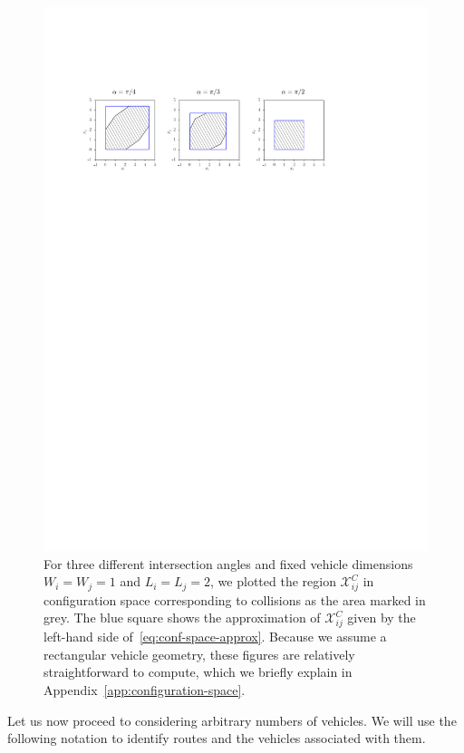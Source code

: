 \documentclass[a4paper]{report}
\theoremstyle{definition}
\theoremstyle{plain}
\begin{document}
\begin{figure}[b]
  \centering
  \includegraphics[scale=1]{figures/intersection-config-spaces}
  \caption{For three different intersection angles and fixed vehicle dimensions
    $W_{i} = W_{j} = 1$ and $L_{i} = L_{j} = 2$, we plotted the region
    $\mathcal{X}_{ij}^{C}$ in configuration space corresponding to collisions as
    the area marked in grey. The blue square shows the approximation of
    $\mathcal{X}_{ij}^C$ given by the left-hand side of~\eqref{eq:conf-space-approx}. Because we assume a
    rectangular vehicle geometry, these figures are relatively straightforward
    to compute, which we briefly explain in
    Appendix~\ref{app:configuration-space}.}%
  \label{fig:intersection-config-spaces}
\end{figure}

Let us now proceed to considering arbitrary numbers of vehicles. We will use the
following notation to identify routes and the vehicles associated with them.
\end{document}
